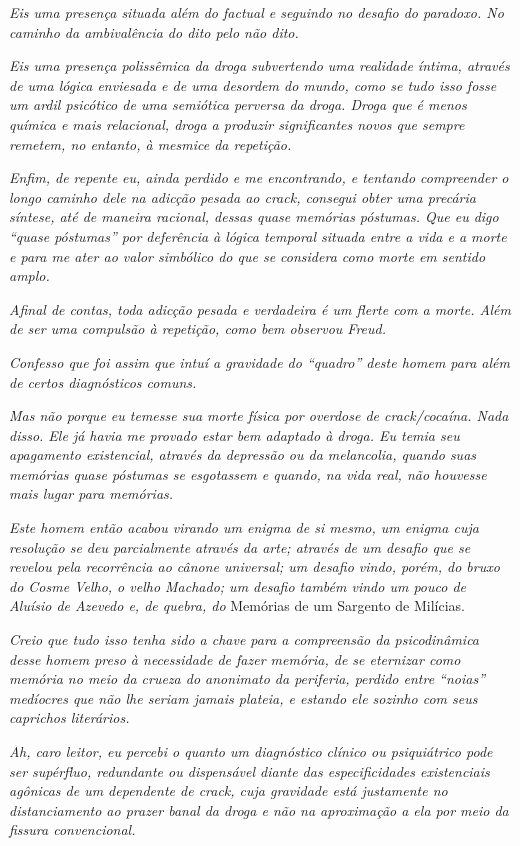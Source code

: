 \emph{Eis uma presença situada além do factual e seguindo no desafio do
paradoxo. No caminho da ambivalência do dito pelo não dito.}

\emph{Eis uma presença polissêmica da droga subvertendo uma realidade
íntima, através de uma lógica enviesada e de uma desordem do mundo, como
se tudo isso fosse um ardil psicótico de uma semiótica perversa da
droga. Droga que é menos química e mais relacional, droga a produzir
significantes novos que sempre remetem, no entanto, à mesmice da
repetição.}

\emph{Enfim, de repente eu, ainda perdido e me encontrando, e tentando
compreender o longo caminho dele na adicção pesada ao crack, consegui
obter uma precária síntese, até de maneira racional, dessas quase
memórias póstumas. Que eu digo ``quase póstumas'' por deferência à
lógica temporal situada entre a vida e a morte e para me ater ao valor
simbólico do que se considera como morte em sentido amplo.}

\emph{Afinal de contas, toda adicção pesada e verdadeira é um flerte com
a morte. Além de ser uma compulsão à repetição, como bem observou
Freud.}

\emph{Confesso que foi assim que intuí a gravidade do ``quadro'' deste
homem para além de certos diagnósticos comuns.}

\emph{Mas não porque eu temesse sua morte física por overdose de
crack/cocaína. Nada disso. Ele já havia me provado estar bem adaptado à
droga. Eu temia seu apagamento existencial, através da depressão ou da
melancolia, quando suas memórias quase póstumas se esgotassem e quando,
na vida real, não houvesse mais lugar para memórias.}

\emph{Este homem então acabou virando um enigma de si mesmo, um enigma
cuja resolução se deu parcialmente através da arte; através de um
desafio que se revelou pela recorrência ao cânone universal; um desafio
vindo, porém, do bruxo do Cosme Velho, o velho Machado; um desafio
também vindo um pouco de Aluísio de Azevedo e, de quebra, do} Memórias
de um Sargento de Milícias.

\emph{Creio que tudo isso tenha sido a chave para a compreensão da
psicodinâmica desse homem preso à necessidade de fazer memória, de se
eternizar como memória no meio da crueza do anonimato da periferia,
perdido entre ``noias'' medíocres que não lhe seriam jamais plateia, e
estando ele sozinho com seus caprichos literários.}

\emph{Ah, caro leitor, eu percebi o quanto um diagnóstico clínico ou
psiquiátrico pode ser supérfluo, redundante ou dispensável diante das
especificidades existenciais agônicas de um dependente de crack, cuja
gravidade está justamente no distanciamento ao prazer banal da droga e
não na aproximação a ela por meio da fissura convencional.}

